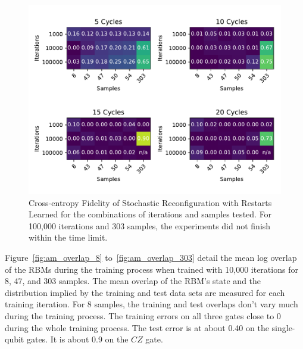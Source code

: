\begin{figure}[H]
  \centering
  \includegraphics[width=\textwidth]{figures/results/AM-restarts-learned/fxeb_heatmap.pdf}
  \caption[Cross-entropy Fidelity of AdaMax with Restarts Learned]{Cross-entropy Fidelity of Stochastic 
  Reconfiguration with Restarts Learned for the combinations of iterations and samples tested.
  For 100,000 iterations and 303 samples, the experiments did not finish within the time limit.}
  \label{fig:am_fxeb}
\end{figure}

Figure~\ref{fig:am_overlap_8} to~\ref{fig:am_overlap_303} detail the mean log overlap of the RBMs during the 
training process when trained with 10,000 iterations for 8, 47, and 303 samples. The 
mean overlap of the RBM's state and the distribution implied by the training and test data sets are measured 
for each training iteration.
For 8 samples, the training and test overlaps don't vary much during the training process. The training errors on all three gates
close to 0 during the whole training process. The test error is at about 0.40 on the single-qubit gates. It is about 
0.9 on the $CZ$ gate.

